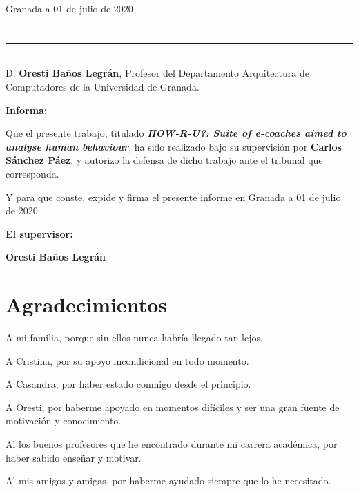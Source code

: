 \vspace{2cm}

\begin{flushright}
Granada a 01 de julio de 2020
\end{flushright}

\newpage

\section*{}
\thispagestyle{empty}

\noindent\rule[-1ex]{\textwidth}{2pt}\\[4.5ex]

D. \textbf{Oresti Baños Legrán}, Profesor del Departamento Arquitectura de Computadores de la Universidad de Granada.



\vspace{0.5cm}

\textbf{Informa:}

\vspace{0.5cm}

Que el presente trabajo, titulado \textit{\textbf{HOW-R-U?: Suite of e-coaches aimed to analyse human behaviour}},
ha sido realizado bajo su supervisión por \textbf{Carlos Sánchez Páez}, y autorizo la defensa de dicho trabajo ante el tribunal
que corresponda.

\vspace{0.5cm}

Y para que conste, expide y firma el presente informe en Granada a 01 de julio de 2020

\vspace{1cm}

\textbf{El supervisor:}

\vspace{5cm}
\begin{center}
\textbf{Oresti Baños Legrán}

\end{center}


\newpage

\section*{Agradecimientos}
\thispagestyle{empty}

\vspace{1cm}
\begin{flushleft}
A mi familia, porque sin ellos nunca habría llegado tan lejos.

A Cristina, por su apoyo incondicional en todo momento.

A Casandra, por haber estado conmigo desde el principio.

A Oresti, por haberme apoyado en momentos difíciles y ser una gran fuente de motivación y conocimiento.

Al los buenos profesores que he encontrado durante mi carrera académica, por haber sabido enseñar y motivar.

Al mis amigos y amigas, por haberme ayudado siempre que lo he necesitado.
\end{flushleft}
